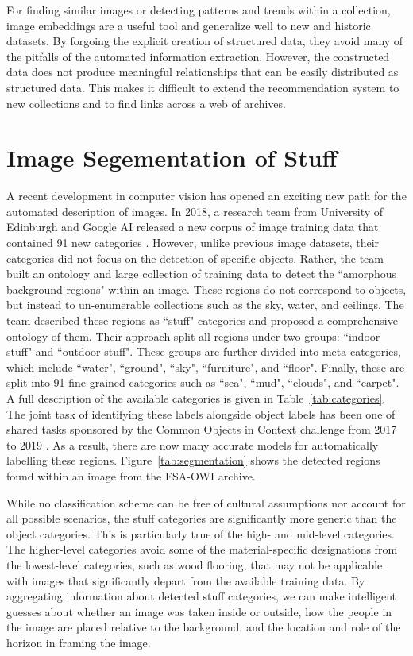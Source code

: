 \documentclass[10pt, a4paper]{article}
\begin{document}
For finding similar images or detecting patterns and trends within a collection,
image embeddings are a useful tool and generalize well to new and historic datasets.
By forgoing the explicit creation of structured data, they avoid many of the
pitfalls of the automated information extraction. However, the constructed data
does not produce meaningful relationships that can be easily distributed as
structured data. This makes it difficult to extend the recommendation system
to new collections and to find links across a web of archives.


\section{Image Segementation of Stuff} \label{sec:imageseg}

A recent development in computer vision has opened an exciting new path for the
automated description of images. In 2018, a research team from
University of Edinburgh and Google AI released a new corpus of image training
data that contained 91 new categories \cite{caesar2018coco}. However, unlike
previous image datasets, their categories did not focus on the detection of
specific objects. Rather, the team built an ontology and large collection of
training data to detect the ``amorphous background regions" within an image.
These regions do not correspond to objects, but instead to un-enumerable
collections such as the sky, water, and ceilings. The team described these
regions as ``stuff" categories and proposed a comprehensive ontology of them.
Their approach split all regions under two groups: ``indoor stuff" and
``outdoor stuff". These groups are further divided into meta categories,
which include ``water", ``ground", ``sky", ``furniture", and ``floor". Finally,
these are split into 91 fine-grained
categories such as ``sea", ``mud", ``clouds", and ``carpet". A full description
of the available categories is given in Table~\ref{tab:categories}.
The joint task of identifying these labels alongside object labels
has been one of shared tasks sponsored by the Common Objects in Context
challenge from 2017 to 2019 \cite{kirillov2019panoptic}.
As a result, there are now many accurate models for automatically labelling
these regions. Figure~\ref{tab:segmentation} shows the detected regions found
within an image from the FSA-OWI archive.

While no classification scheme
can be free of cultural assumptions nor account for all possible scenarios,
the stuff categories are significantly more generic than the object categories.
This is particularly true of the high- and mid-level categories. The
higher-level categories avoid some of the material-specific designations from
the lowest-level categories, such as wood flooring, that may not be applicable
with images that significantly depart from the available training data. By
aggregating information about detected stuff categories, we can make intelligent
guesses about whether an image was taken inside or outside, how the people in
the image are placed relative to the background, and the location and role of
the horizon in framing the image.
\end{document}

